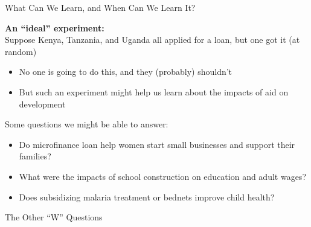 \documentclass[10pt,xcolor=table,ignorenonframetext,handout,aspectratio=169]{beamer}
\newlength{\wideitemsep}
\let\olditem\item
\renewcommand{\item}{\setlength{\itemsep}{\wideitemsep}\olditem}
\begin{document}
\begin{frame}{What Can We Learn, and When Can We Learn It?}

\medskip
\textbf{An ``ideal'' experiment:} \\
Suppose Kenya, Tanzania, and Uganda all applied for a loan, but one got it (at random)

\medskip
\begin{itemize}
	
	\item No one is going to do this, and they (probably) shouldn't
	
	\item But such an experiment might help us learn about the impacts of aid on development
	
\end{itemize}

\pause
\medskip
\medskip
Some questions we might be able to answer:

\medskip
\begin{itemize}
	
	\item Do microfinance loan help women start small businesses and support their families?
	
	\item What were the impacts of school construction on education and adult wages?  
	
	\item Does subsidizing malaria treatment or bednets improve child health?  
	
\end{itemize}

\end{frame}





\begin{frame}[plain]

	
	\begin{center}
		
		\Large{\textcolor{williams}{The Other ``W'' Questions}}
		
	\end{center}
	
\end{frame}
\end{document}
